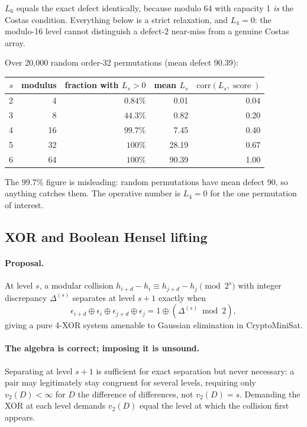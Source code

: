 \documentclass[11pt,a4paper]{article}
\theoremstyle{definition}
\newcommand{\score}{\operatorname{score}}
\newcommand{\vtwo}{v_2}
\begin{document}
$L_6$ equals the exact defect identically, because modulo 64 with capacity 1
\emph{is} the Costas condition. Everything below is a strict relaxation, and
$L_4=0$: the modulo-16 level cannot distinguish a defect-2 near-miss from a
genuine Costas array.

Over 20{,}000 random order-32 permutations (mean defect 90.39):

\begin{center}
\begin{tabular}{@{}rrrrr@{}}
\toprule
$s$ & modulus & fraction with $L_s>0$ & mean $L_s$ & $\mathrm{corr}(L_s,\score)$ \\
\midrule
2 & 4 & $0.84\%$ & 0.01 & 0.04 \\
3 & 8 & $44.3\%$ & 0.82 & 0.20 \\
4 & 16 & $99.7\%$ & 7.45 & 0.40 \\
5 & 32 & $100\%$ & 28.19 & 0.67 \\
6 & 64 & $100\%$ & 90.39 & 1.00 \\
\bottomrule
\end{tabular}
\end{center}

The $99.7\%$ figure is misleading: random permutations have mean defect 90, so
anything catches them. The operative number is $L_4=0$ for the one permutation
of interest.

\subsection{XOR and Boolean Hensel lifting}
\label{sec:xor}

\paragraph{Proposal.} At level $s$, a modular collision
$h_{i+d}-h_i\equiv h_{j+d}-h_j \pmod{2^s}$ with integer discrepancy
$\Delta^{(s)}$ separates at level $s+1$ exactly when
\[
\epsilon_{i+d}\oplus\epsilon_i\oplus\epsilon_{j+d}\oplus\epsilon_j
= 1 \oplus (\Delta^{(s)}\bmod 2),
\]
giving a pure 4-XOR system amenable to Gaussian elimination in CryptoMiniSat.

\paragraph{The algebra is correct; imposing it is unsound.} Separating at level
$s+1$ is sufficient for exact separation but never necessary: a pair may
legitimately stay congruent for several levels, requiring only
$\vtwo(D)<\infty$ for $D$ the difference of differences, not $\vtwo(D)=s$.
Demanding the XOR at each level demands $\vtwo(D)$ equal the level at which the
collision first appears.
\end{document}
